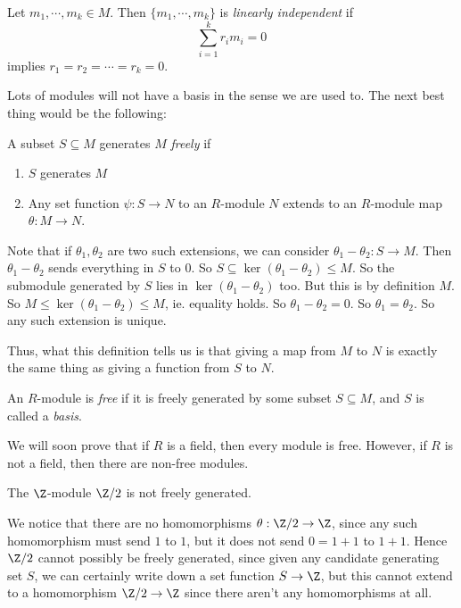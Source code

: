 \documentclass[a4paper]{article}
\begin{document}
\begin{defi}
  Let $m_1, \cdots, m_k \in M$. Then $\{m_1, \cdots, m_k\}$ is \emph{linearly independent} if
  \[
    \sum_{i = 1}^k r_i m_i = 0
  \]
  implies $r_1 = r_2 = \cdots = r_k = 0$.
\end{defi}

Lots of modules will not have a basis in the sense we are used to. The next best thing would be the following:
\begin{defi}
  A subset $S \subseteq M$ generates $M$ \emph{freely} if
  \begin{enumerate}
    \item $S$ generates $M$
    \item Any set function $\psi: S \to N$ to an $R$-module $N$ extends to an $R$-module map $\theta: M \to N$.
  \end{enumerate}
\end{defi}
Note that if $\theta_1, \theta_2$ are two such extensions, we can consider $\theta_1 - \theta_2: S \to M$. Then $\theta_1 - \theta_2$ sends everything in $S$ to $0$. So $S \subseteq \ker (\theta_1 - \theta_2) \leq M$. So the submodule generated by $S$ lies in $\ker (\theta_1 - \theta_2)$ too. But this is by definition $M$. So $M \leq \ker(\theta_1 - \theta_2) \leq M$, ie. equality holds. So $\theta_1 - \theta_2 = 0$. So $\theta_1 = \theta_2$. So any such extension is unique.

Thus, what this definition tells us is that giving a map from $M$ to $N$ is exactly the same thing as giving a function from $S$ to $N$.

\begin{defi}
  An $R$-module is \emph{free} if it is freely generated by some subset $S \subseteq M$, and $S$ is called a \emph{basis}.
\end{defi}
We will soon prove that if $R$ is a field, then every module is free. However, if $R$ is not a field, then there are non-free modules.
\begin{eg}
  The $\Z$-module $\Z/2$ is not freely generated.

  We notice that there are no homomorphisms $\theta: \Z/2 \to \Z$, since any such homomorphism must send $1$ to $1$, but it does not send $0 = 1 + 1$ to $1 + 1$. Hence $\Z/2$ cannot possibly be freely generated, since given any candidate generating set $S$, we can certainly write down a set function $S \to \Z$, but this cannot extend to a homomorphism $\Z/2 \to \Z$ since there aren't any homomorphisms at all.
\end{eg}
\end{document}
